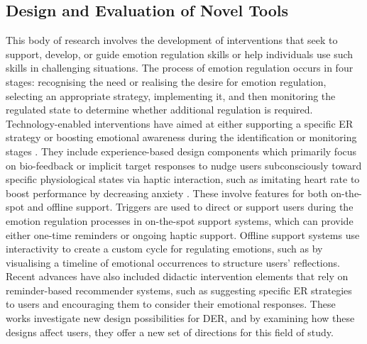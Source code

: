 \documentclass[lettersize,journal]{IEEEtran}
\begin{document}
\subsection{Design and Evaluation of Novel Tools}
This body of research involves the development of interventions that seek to support, develop, or guide emotion regulation skills or help individuals use such skills in challenging situations. The process of emotion regulation occurs in four stages: recognising the need or realising the desire for emotion regulation, selecting an appropriate strategy, implementing it, and then monitoring the regulated state to determine whether additional regulation is required. Technology-enabled interventions have aimed at either supporting a specific ER strategy or boosting emotional awareness during the identification or monitoring stages \cite{slovak2022designing}. 
They include experience-based design components which primarily focus on bio-feedback or implicit target responses to nudge users subconsciously toward specific physiological states via haptic interaction, such as imitating heart rate to boost performance by decreasing anxiety \cite{smith2022digital}. These involve features for both on-the-spot and offline support. Triggers are used to direct or support users during the emotion regulation processes in on-the-spot support systems, which can provide either one-time reminders or ongoing haptic support. Offline support systems use interactivity to create a custom cycle for regulating emotions, such as by visualising a timeline of emotional occurrences to structure users' reflections. Recent advances have also included didactic intervention elements that rely on reminder-based recommender systems, such as suggesting specific ER strategies to users and encouraging them to consider their emotional responses. These works investigate new design possibilities for DER, and by examining how these designs affect users, they offer a new set of directions for this field of study.
\vspace{-0.15cm}
\end{document}

